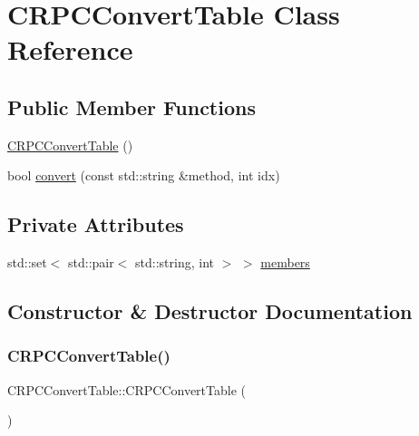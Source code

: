 \hypertarget{class_c_r_p_c_convert_table}{}\section{C\+R\+P\+C\+Convert\+Table Class Reference}
\label{class_c_r_p_c_convert_table}
\subsection*{Public Member Functions}
\begin{DoxyCompactItemize}
\item 
\mbox{\hyperlink{class_c_r_p_c_convert_table_a7f79dde2002bd2bc2178bd38f213922d}{C\+R\+P\+C\+Convert\+Table}} ()
\item 
bool \mbox{\hyperlink{class_c_r_p_c_convert_table_a034b770cb03e79074111b85eba889e58}{convert}} (const std\+::string \&method, int idx)
\end{DoxyCompactItemize}
\subsection*{Private Attributes}
\begin{DoxyCompactItemize}
\item 
std\+::set$<$ std\+::pair$<$ std\+::string, int $>$ $>$ \mbox{\hyperlink{class_c_r_p_c_convert_table_a6fa71fee177e85db3846acbb7b9c6025}{members}}
\end{DoxyCompactItemize}


\subsection{Constructor \& Destructor Documentation}
\mbox{\label{class_c_r_p_c_convert_table_a7f79dde2002bd2bc2178bd38f213922d}} 
\subsubsection{\texorpdfstring{C\+R\+P\+C\+Convert\+Table()}{CRPCConvertTable()}}
{\footnotesize\ttfamily C\+R\+P\+C\+Convert\+Table\+::\+C\+R\+P\+C\+Convert\+Table (\begin{DoxyParamCaption}{ }\end{DoxyParamCaption})}



